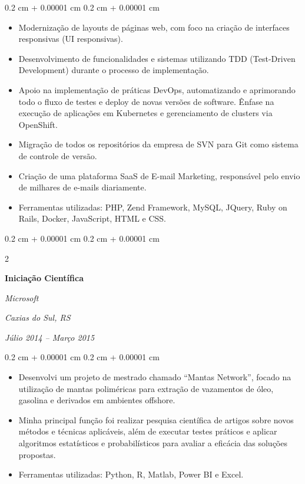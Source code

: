 \documentclass[10pt, letterpaper]{article}
\newenvironment{highlights}{
    \begin{itemize}[
        topsep=0.10 cm,
        parsep=0.10 cm,
        partopsep=0pt,
        itemsep=0pt,
        leftmargin=0.4 cm + 10pt
    ]
}{
    \end{itemize}
} %
\newenvironment{onecolentry}{
    \begin{adjustwidth}{
        0.2 cm + 0.00001 cm
    }{
        0.2 cm + 0.00001 cm
    }
}{
    \end{adjustwidth}
} %
\newenvironment{twocolentry}[2][]{
    \onecolentry
    \def\secondColumn{#2}
    \setcolumnwidth{\fill, 4.5 cm}
    \begin{paracol}{2}
}{
    \switchcolumn \raggedleft \secondColumn
    \end{paracol}
    \endonecolentry
} %
\begin{document}
        \vspace{0.10 cm}
        \begin{onecolentry}
            \begin{highlights}
                \item Modernização de layouts de páginas web, com foco na criação de interfaces responsivas (UI responsivas).
                \item Desenvolvimento de funcionalidades e sistemas utilizando TDD (Test-Driven Development) durante o processo de implementação.
                \item Apoio na implementação de práticas DevOps, automatizando e aprimorando todo o fluxo de testes e deploy de novas versões de software. Ênfase na execução de aplicações em Kubernetes e gerenciamento de clusters via OpenShift.
                \item Migração de todos os repositórios da empresa de SVN para Git como sistema de controle de versão.
                \item Criação de uma plataforma SaaS de E-mail Marketing, responsável pelo envio de milhares de e-mails diariamente.
                \item Ferramentas utilizadas: PHP, Zend Framework, MySQL, JQuery, Ruby on Rails, Docker, JavaScript, HTML e CSS.
            \end{highlights}
        \end{onecolentry}


        \vspace{0.2 cm}

        \begin{twocolentry}{
        \textit{Caxias do Sul, RS}    
            
        \textit{Júlio 2014 – Março 2015}}
            \textbf{Iniciação Científica}
            
            \textit{Microsoft}
        \end{twocolentry}

        \vspace{0.10 cm}
        \begin{onecolentry}
            \begin{highlights}
                \item Desenvolvi um projeto de mestrado chamado “Mantas Network”, focado na utilização de mantas poliméricas para extração de vazamentos de óleo, gasolina e derivados em ambientes offshore.
                \item Minha principal função foi realizar pesquisa científica de artigos sobre novos métodos e técnicas aplicáveis, além de executar testes práticos e aplicar algoritmos estatísticos e probabilísticos para avaliar a eficácia das soluções propostas.
                \item Ferramentas utilizadas: Python, R, Matlab, Power BI e Excel.
            \end{highlights}
        \end{onecolentry}
\end{document}
